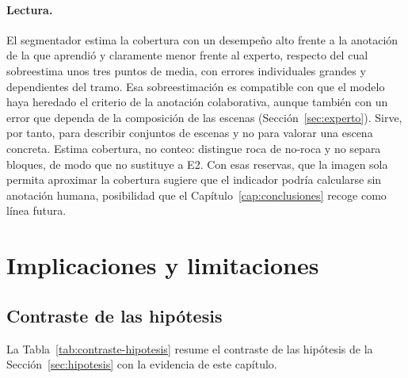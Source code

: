 \paragraph{Lectura.} El segmentador estima la cobertura con un desempeño alto frente a la
anotación de la que aprendió y claramente menor frente al experto, respecto del cual sobreestima unos
tres puntos de media, con errores individuales grandes y dependientes del tramo. Esa
sobreestimación es compatible con que el modelo haya heredado el criterio de la anotación
colaborativa, aunque también con un error que dependa de la composición de las escenas
(Sección~\ref{sec:experto}). Sirve, por tanto, para describir conjuntos de escenas y no para valorar una escena
concreta. Estima cobertura, no conteo: distingue roca de no-roca y no separa bloques, de modo
que no sustituye a E2. Con esas reservas, que la imagen sola permita aproximar la cobertura
sugiere que el indicador podría calcularse sin anotación humana, posibilidad que el
Capítulo~\ref{cap:conclusiones} recoge como línea futura.

\section{Implicaciones y limitaciones}

\subsection{Contraste de las hipótesis}

La Tabla~\ref{tab:contraste-hipotesis} resume el contraste de las hipótesis de la
Sección~\ref{sec:hipotesis} con la evidencia de este capítulo.

